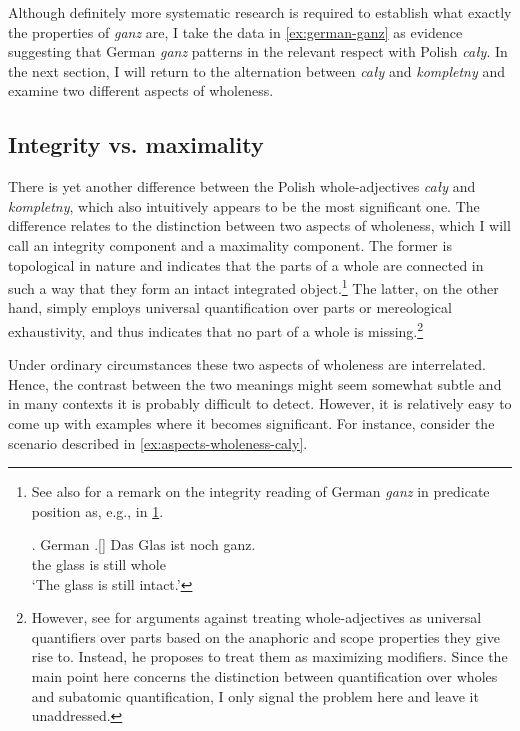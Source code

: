 Although definitely more systematic research is required to establish what exactly the properties of \textit{ganz} are, I take the data in \ref{ex:german-ganz} as evidence suggesting that German \textit{ganz} patterns in the relevant respect with Polish \textit{cały}. In the next section, I will return to the alternation between \textit{cały} and \textit{kompletny} and examine two different aspects of wholeness.

\subsection{Integrity vs. maximality}\label{sec:integrity-vs-maximality}

There is yet another difference between the Polish whole-adjectives \textit{cały} and \textit{kompletny}, which also intuitively appears to be the most significant one. The difference relates to the distinction between two aspects of wholeness, which I will call an integrity component and a maximality component. The former is topological in nature and indicates that the parts of a whole are connected in such a way that they form an intact integrated object.\footnote{See also \citep[p. 127]{moltmann1997parts} for a remark on the integrity reading of German \textit{ganz} in predicate position as, e.g., in \ref{ex:german-ganz-integrity}.

\ex. German \citep[p. 127; adapted]{moltmann1997parts}\label{ex:german-ganz-integrity}
\bg.[] Das Glas ist noch ganz.\\
the glass is still whole\\
`The glass is still intact.'

} The latter, on the other hand, simply employs universal quantification over parts or mereological exhaustivity, and thus indicates that no part of a whole is missing.\footnote{However, see \citet{morzycki2002wholes} for arguments against treating whole-adjectives as universal quantifiers over parts based on the anaphoric and scope properties they give rise to. Instead, he proposes to treat them as maximizing modifiers. Since the main point here concerns the distinction between quantification over wholes and subatomic quantification, I only signal the problem here and leave it unaddressed.} 

Under ordinary circumstances these two aspects of wholeness are interrelated. Hence, the contrast between the two meanings might seem somewhat subtle and in many contexts it is probably difficult to detect. However, it is relatively easy to come up with examples where it becomes significant. For instance, consider the scenario described in \ref{ex:aspects-wholeness-caly}. 


